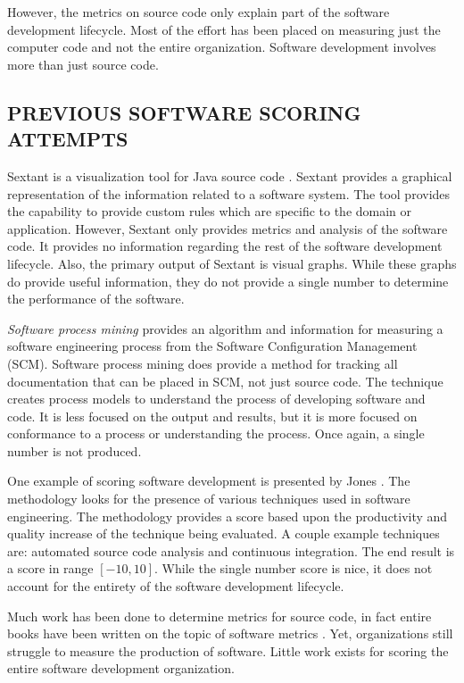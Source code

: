 \documentclass[SDSUThesis.tex]{subfiles}
\begin{document}
However, the metrics on source code only explain part of the software development lifecycle.  
Most of the effort has been placed on measuring just the computer code and not the entire organization.  Software
development involves more than just source code.


\subsection{PREVIOUS SOFTWARE SCORING ATTEMPTS }

Sextant is a visualization tool for Java source code \cite{Winter2013}.  Sextant provides a graphical representation of the information related 
to a software system.  The tool provides the capability to provide custom rules which are specific to the domain or application.  However,
Sextant only provides metrics and analysis of the software code.  It provides no information regarding the rest of the 
software development lifecycle.  Also, the primary output of Sextant is visual graphs.  While these graphs do provide
useful information, they do not provide a single number to determine the performance of the software.

\textit{Software process mining} \cite{Rubin2007} provides
an algorithm and information for measuring a software engineering process from
the Software Configuration Management (SCM). Software process mining does provide a method for tracking all 
documentation that can be placed in SCM, not just source code.  The technique creates process models 
to understand the process of developing software and code. It is less focused on the output and results,
but it is more focused on conformance to a process or understanding the process. Once again, a single number is not produced.

One example of scoring software development is presented by Jones \cite{Jones2012}. The methodology looks
for the presence of various techniques used in software engineering.  The methodology provides a score based upon the 
productivity and quality increase of the technique being evaluated.  A couple example techniques are: 
automated source code analysis and continuous integration.  The end result is a score in range $[-10,10]$. 
While the single number score is nice, it does not account for the entirety of the software development lifecycle.

Much work has been done to determine metrics for source code, in fact 
entire books have been written on the topic of software metrics \cite{Jones1996, Putnam2013}. Yet, 
organizations still struggle to measure the production of software.
Little work exists
for scoring the entire software development organization. 
\end{document}
